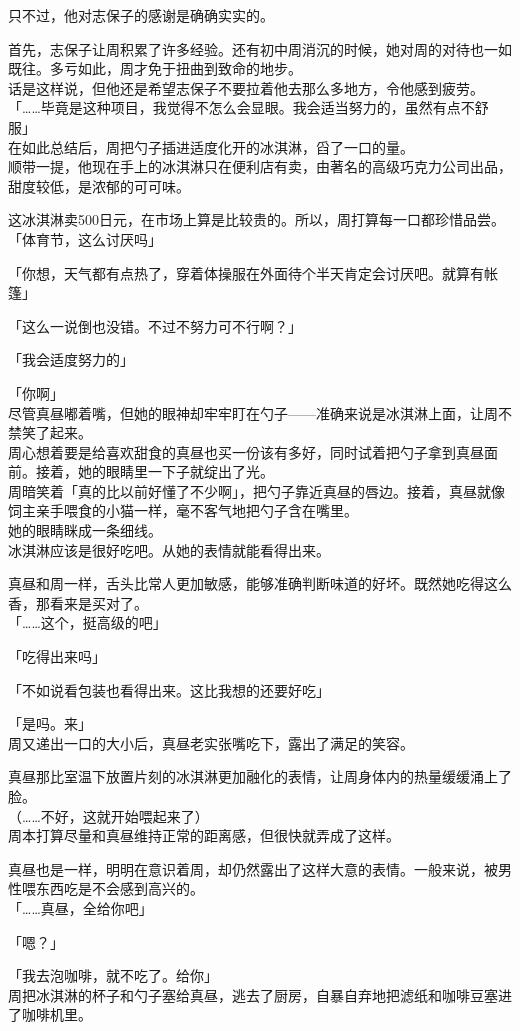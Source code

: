 只不过，他对志保子的感谢是确确实实的。

首先，志保子让周积累了许多经验。还有初中周消沉的时候，她对周的对待也一如既往。多亏如此，周才免于扭曲到致命的地步。\\

话是这样说，但他还是希望志保子不要拉着他去那么多地方，令他感到疲劳。\\

「……毕竟是这种项目，我觉得不怎么会显眼。我会适当努力的，虽然有点不舒服」\\

在如此总结后，周把勺子插进适度化开的冰淇淋，舀了一口的量。\\

顺带一提，他现在手上的冰淇淋只在便利店有卖，由著名的高级巧克力公司出品，甜度较低，是浓郁的可可味。

这冰淇淋卖500日元，在市场上算是比较贵的。所以，周打算每一口都珍惜品尝。\\

「体育节，这么讨厌吗」

「你想，天气都有点热了，穿着体操服在外面待个半天肯定会讨厌吧。就算有帐篷」

「这么一说倒也没错。不过不努力可不行啊？」

「我会适度努力的」

「你啊」\\

尽管真昼嘟着嘴，但她的眼神却牢牢盯在勺子——准确来说是冰淇淋上面，让周不禁笑了起来。\\

周心想着要是给喜欢甜食的真昼也买一份该有多好，同时试着把勺子拿到真昼面前。接着，她的眼睛里一下子就绽出了光。\\

周暗笑着「真的比以前好懂了不少啊」，把勺子靠近真昼的唇边。接着，真昼就像饲主亲手喂食的小猫一样，毫不客气地把勺子含在嘴里。\\

她的眼睛眯成一条细线。\\

冰淇淋应该是很好吃吧。从她的表情就能看得出来。

真昼和周一样，舌头比常人更加敏感，能够准确判断味道的好坏。既然她吃得这么香，那看来是买对了。\\

「……这个，挺高级的吧」

「吃得出来吗」

「不如说看包装也看得出来。这比我想的还要好吃」

「是吗。来」\\

周又递出一口的大小后，真昼老实张嘴吃下，露出了满足的笑容。

真昼那比室温下放置片刻的冰淇淋更加融化的表情，让周身体内的热量缓缓涌上了脸。\\

（……不好，这就开始喂起来了）\\

周本打算尽量和真昼维持正常的距离感，但很快就弄成了这样。

真昼也是一样，明明在意识着周，却仍然露出了这样大意的表情。一般来说，被男性喂东西吃是不会感到高兴的。\\

「……真昼，全给你吧」

「嗯？」

「我去泡咖啡，就不吃了。给你」\\

周把冰淇淋的杯子和勺子塞给真昼，逃去了厨房，自暴自弃地把滤纸和咖啡豆塞进了咖啡机里。
